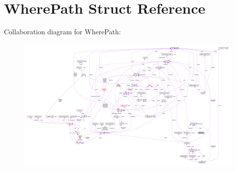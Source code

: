 \hypertarget{structWherePath}{}\section{Where\+Path Struct Reference}
\label{structWherePath}


Collaboration diagram for Where\+Path\+:\nopagebreak
\begin{figure}[H]
\begin{center}
\leavevmode
\includegraphics[width=350pt]{structWherePath__coll__graph}
\end{center}
\end{figure}
